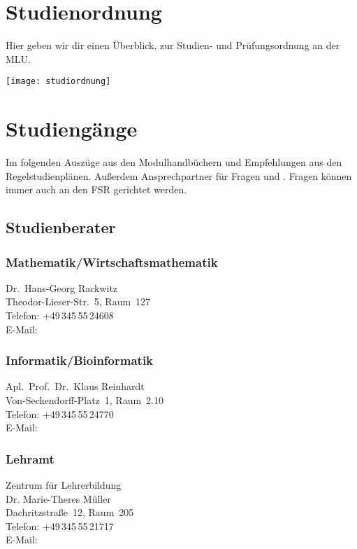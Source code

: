 
\section{Studienordnung}
Hier geben wir dir einen Überblick,
zur Studien- und Prüfungsordnung an der MLU.
\begin{center}
	\texttt{[image: studiordnung]}	
\end{center}

\section{Studiengänge}

Im folgenden Auszüge aus den Modulhandbüchern und Empfehlungen aus den Regelstudienplänen.
Außerdem Ansprechpartner für Fragen und .
Fragen können immer auch an den FSR gerichtet werden.

\subsection{Studienberater}
\subsubsection{Mathematik/Wirtschaftsmathematik}
Dr.\ Hans-Georg Rackwitz \\
Theodor-Lieser-Str.~5, Raum~127 \\
Telefon: +49\,345\,55\,24608\\
E-Mail: \\

\subsubsection{Informatik/Bioinformatik}
Apl.\ Prof.\ Dr.\ Klaus Reinhardt \\
Von-Seckendorff-Platz~1, Raum~2.10 \\
Telefon: +49\,345\,55\,24770 \\
E-Mail: 

\subsubsection{Lehramt}
Zentrum für Lehrerbildung \\
Dr. Marie-Theres Müller \\
Dachritzstraße~12, Raum~205 \\
Telefon: +49\,345\,55\,21717 \\
E-Mail: 

